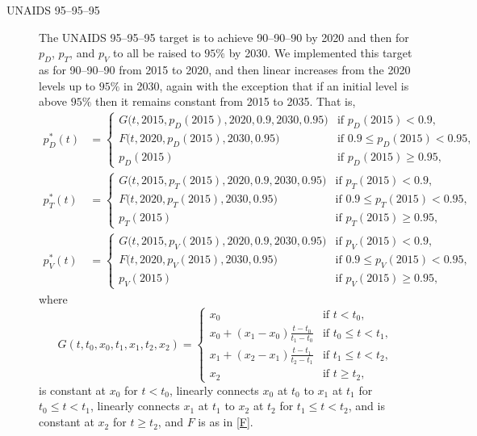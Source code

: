 \documentclass{article}
\begin{document}
\begin{description}
\item[UNAIDS 95--95--95] The UNAIDS 95--95--95 target is to achieve
  90--90--90 by 2020 and then for $p_D$, $p_T$, and $p_V$ to all be
  raised to $95\%$ by 2030.  We implemented this target as for
  90--90--90 from 2015 to 2020, and then linear increases from the
  2020 levels up to $95\%$ in 2030, again with the exception that if
  an initial level is above $95\%$ then it remains constant from 2015
  to 2035.  That is,
  \begin{equation}
    \label{unaids95_targets}
    \begin{split}
      p_D^*(t) &=
      \begin{cases}
        G\big(t, 2015, p_D(2015), 2020, 0.9, 2030, 0.95\big)
        & \text{if $p_D(2015) < 0.9$},
        \\
        F\big(t, 2020, p_D(2015), 2030, 0.95\big)
        & \text{if $0.9 \leq p_D(2015) < 0.95$},
        \\
        p_D(2015) & \text{if $p_D(2015) \geq 0.95$},
      \end{cases}
      \\
      p_T^*(t) &=
      \begin{cases}
        G\big(t, 2015, p_T(2015), 2020, 0.9, 2030, 0.95\big)
        & \text{if $p_T(2015) < 0.9$},
        \\
        F\big(t, 2020, p_T(2015), 2030, 0.95\big)
        & \text{if $0.9 \leq p_T(2015) < 0.95$},
        \\
        p_T(2015) & \text{if $p_T(2015) \geq 0.95$},
      \end{cases}
      \\
      p_V^*(t) &=
      \begin{cases}
        G\big(t, 2015, p_V(2015), 2020, 0.9, 2030, 0.95\big)
        & \text{if $p_V(2015) < 0.9$},
        \\
        F\big(t, 2020, p_V(2015), 2030, 0.95\big)
        & \text{if $0.9 \leq p_V(2015) < 0.95$},
        \\
        p_V(2015) & \text{if $p_V(2015) \geq 0.95$},
      \end{cases}
    \end{split}
  \end{equation}
  where
  \begin{equation}
    G(t, t_0, x_0, t_1, x_1, t_2, x_2) =
    \begin{cases}
      x_0 & \text{if $t < t_0$},
      \\
      x_0 + (x_1 - x_0) \frac{t - t_0}{t_1 - t_0} &
      \text{if $t_0 \leq t < t_1$},
      \\
      x_1 + (x_2 - x_1) \frac{t - t_1}{t_2 - t_1} &
      \text{if $t_1 \leq t < t_2$},
      \\
      x_2 & \text{if $t \geq t_2$},
    \end{cases}
  \end{equation}
  is constant at $x_0$ for $t < t_0$, linearly connects $x_0$ at $t_0$
  to $x_1$ at $t_1$ for $t_0 \leq t < t_1$, linearly connects $x_1$ at
  $t_1$ to $x_2$ at $t_2$ for $t_1 \leq t < t_2$, and is constant at
  $x_2$ for $t \geq t_2$, and $F$ is as in \eqref{F}.

\end{description}
\end{document}
